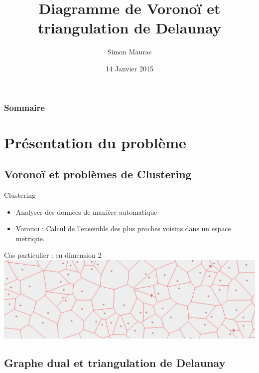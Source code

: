 \documentclass{beamer}
\title{Diagramme de Voronoï et triangulation de Delaunay}
\author{Simon Mauras}
\institute{ENS Lyon}
\date{14 Janvier 2015}
\begin{document}
\begin{frame}
  \titlepage
\end{frame}

\begin{frame}
  \frametitle{Sommaire}
  \tableofcontents
\end{frame}

\section{Présentation du problème}

\subsection{Voronoï et problèmes de Clustering}

\begin{frame}
  \begin{block}{Clustering}
    \begin{itemize}
      \item Analyser des données de manière automatique
      \item Voronoï : Calcul de l'ensemble des plus proches voisins dans un espace metrique.
    \end{itemize}
  \end{block}

  \begin{block}{Cas particulier : en dimension 2}
    \includegraphics[width=\textwidth]{voronoi.png}
  \end{block}
\end{frame}
  
\subsection{Graphe dual et triangulation de Delaunay}
\end{document}
